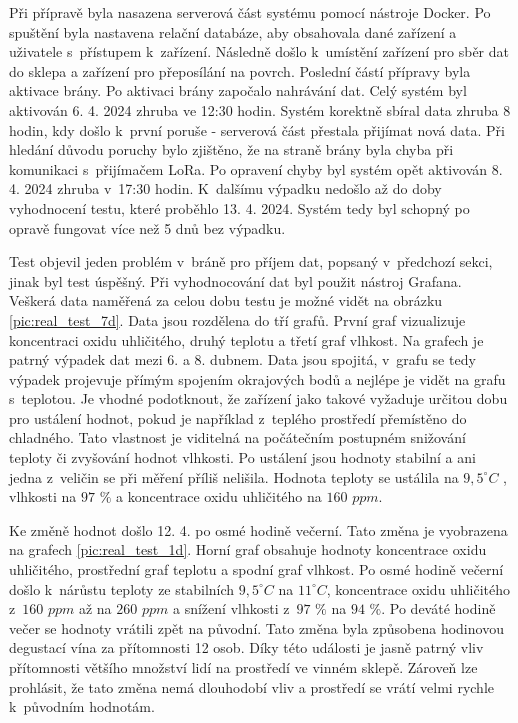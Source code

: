 Při přípravě byla nasazena serverová část systému pomocí nástroje Docker. Po spuštění byla nastavena relační databáze, aby obsahovala dané zařízení a uživatele s~přístupem k~zařízení. Následně došlo k~umístění zařízení pro sběr dat do sklepa a zařízení pro přeposílání na povrch. Poslední částí přípravy byla aktivace brány. Po aktivaci brány započalo nahrávání dat. Celý systém byl aktivován 6. 4. 2024 zhruba ve 12:30 hodin. Systém korektně sbíral data zhruba 8 hodin, kdy došlo k~první poruše - serverová část přestala přijímat nová data. Při hledání důvodu poruchy bylo zjištěno, že na straně brány byla chyba při komunikaci s~přijímačem LoRa. Po opravení chyby byl systém opět aktivován 8. 4. 2024 zhruba v~17:30 hodin. K~dalšímu výpadku nedošlo až do doby vyhodnocení testu, které proběhlo 13. 4. 2024. Systém tedy byl schopný po opravě fungovat více než 5 dnů bez výpadku. 


Test objevil jeden problém v~bráně pro příjem dat, popsaný v~předchozí sekci, jinak byl test úspěšný. Při vyhodnocování dat byl použit nástroj Grafana. Veškerá data naměřená za celou dobu testu je možné vidět na obrázku \ref{pic:real_test_7d}. Data jsou rozdělena do tří grafů. První graf vizualizuje koncentraci oxidu uhličitého, druhý teplotu a třetí graf vlhkost. Na grafech je patrný výpadek dat mezi 6. a 8. dubnem. Data jsou spojitá, v~grafu se tedy výpadek projevuje přímým spojením okrajových bodů a nejlépe je vidět na grafu s~teplotou. Je vhodné podotknout, že zařízení jako takové vyžaduje určitou dobu pro ustálení hodnot, pokud je například z~teplého prostředí přemístěno do chladného. Tato vlastnost je viditelná na počátečním postupném snižování teploty či zvyšování hodnot vlhkosti. Po ustálení jsou hodnoty stabilní a ani jedna z~veličin se při měření příliš nelišila. Hodnota teploty se ustálila na $9,5^\circ C$ , vlhkosti na $97$ $\%$ a koncentrace oxidu uhličitého na $160$ $ppm$.


Ke změně hodnot došlo 12. 4. po osmé hodině večerní. Tato změna je vyobrazena na grafech \ref{pic:real_test_1d}. Horní graf obsahuje hodnoty koncentrace oxidu uhličitého, prostřední graf teplotu a spodní graf vlhkost. Po osmé hodině večerní došlo k~nárůstu teploty ze stabilních $9,5^\circ C$ na $11^\circ C$, koncentrace oxidu uhličitého z~$160$ $ppm$ až na $260$ $ppm$ a snížení vlhkosti z~$97$ $\%$ na $94$ $\%$. Po deváté hodině večer se hodnoty vrátili zpět na původní. Tato změna byla způsobena hodinovou degustací vína za přítomnosti 12 osob. Díky této události je jasně patrný vliv přítomnosti většího množství lidí na prostředí ve vinném sklepě. Zároveň lze prohlásit, že tato změna nemá dlouhodobí vliv a prostředí se vrátí velmi rychle k~původním hodnotám.



